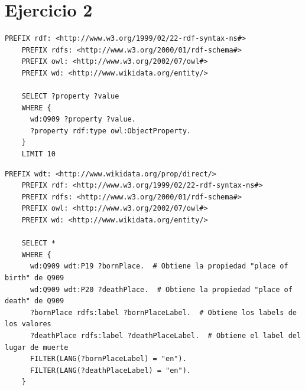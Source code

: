 \section{Ejercicio 2}
\hypersetup{hidelinks}
\begin{tcolorbox}[title=Listar solo 10 propiedades del recurso Jorge Luis Borges \href{http://www.wikidata.org/entity/Q909}{\nolinkurl{http://www.wikidata.org/entity/Q909}}]

  \begin{lstlisting}[language=SPARQL, breaklines=true]
    PREFIX rdf: <http://www.w3.org/1999/02/22-rdf-syntax-ns#>
    PREFIX rdfs: <http://www.w3.org/2000/01/rdf-schema#>
    PREFIX owl: <http://www.w3.org/2002/07/owl#>
    PREFIX wd: <http://www.wikidata.org/entity/>
    
    SELECT ?property ?value
    WHERE {
      wd:Q909 ?property ?value.
      ?property rdf:type owl:ObjectProperty.
    }
    LIMIT 10
  \end{lstlisting}
  \end{tcolorbox}


\begin{tcolorbox}[title=Listar lugar de nacimiento y muerte. La consulta debe retornar también los rdfs:label filtrados por lenguaje inglés (usar FILTER)]

  \begin{lstlisting}[language=SPARQL, breaklines=true]
    PREFIX wdt: <http://www.wikidata.org/prop/direct/>
    PREFIX rdf: <http://www.w3.org/1999/02/22-rdf-syntax-ns#>
    PREFIX rdfs: <http://www.w3.org/2000/01/rdf-schema#>
    PREFIX owl: <http://www.w3.org/2002/07/owl#>
    PREFIX wd: <http://www.wikidata.org/entity/>

    SELECT *
    WHERE {
      wd:Q909 wdt:P19 ?bornPlace.  # Obtiene la propiedad "place of birth" de Q909
      wd:Q909 wdt:P20 ?deathPlace.  # Obtiene la propiedad "place of death" de Q909
      ?bornPlace rdfs:label ?bornPlaceLabel.  # Obtiene los labels de los valores
      ?deathPlace rdfs:label ?deathPlaceLabel.  # Obtiene el label del lugar de muerte
      FILTER(LANG(?bornPlaceLabel) = "en").
      FILTER(LANG(?deathPlaceLabel) = "en").
    }


  \end{lstlisting}
  \end{tcolorbox}

